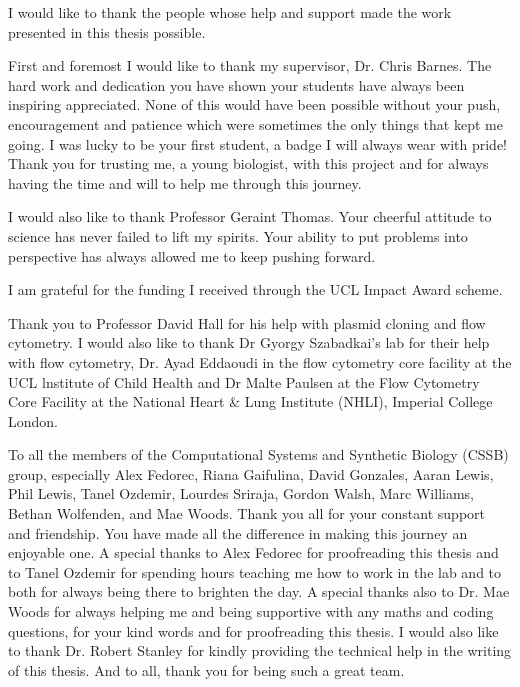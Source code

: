 \documentclass[]{phdthesis}
\begin{document}
\begin{acknowledgements}

I would like to thank the people whose help and support made the work presented in this thesis possible.


First and foremost I would like to thank my supervisor, Dr. Chris Barnes. The hard work and dedication you have shown your students have always been inspiring appreciated. None of this would have been possible without your push, encouragement and patience which were sometimes the only things that kept me going. I was lucky to be your first student, a badge I will always wear with pride! Thank you for  trusting me, a young biologist, with this project and for always having the time and will to help me through this journey.

I would also like to thank Professor Geraint Thomas. Your cheerful attitude to science has never failed to lift my spirits. Your ability to put problems into perspective has always allowed me to keep pushing forward. 

I am grateful for the funding I received through the UCL Impact Award scheme.

Thank you to Professor David Hall for his help with plasmid cloning and flow cytometry. I would also like to thank Dr Gyorgy Szabadkai's lab for their help with flow cytometry, Dr. Ayad Eddaoudi in the flow cytometry core facility at the UCL lnstitute of Child Health and Dr Malte Paulsen at the Flow Cytometry Core Facility at the National Heart \& Lung Institute (NHLI), Imperial College London. 

To all the members of the Computational Systems and Synthetic Biology (CSSB) group, especially Alex Fedorec, Riana Gaifulina, David Gonzales, Aaran Lewis, Phil Lewis, Tanel Ozdemir, Lourdes Sriraja, Gordon Walsh, Marc Williams, Bethan Wolfenden, and Mae Woods. Thank you all for your constant support and friendship. You have made all the difference in making this journey an enjoyable one. A special thanks to Alex Fedorec for proofreading this thesis and to Tanel Ozdemir for spending hours teaching me how to work in the lab and to both for always being there to brighten the day. A special thanks also to Dr. Mae Woods for always helping me and being supportive with any maths and coding questions, for your kind words and for proofreading this thesis. I would also like to thank Dr. Robert Stanley for kindly providing the technical help in the writing of this thesis. And to all, thank you for being such a great team. 



\end{acknowledgements}
\end{document}
